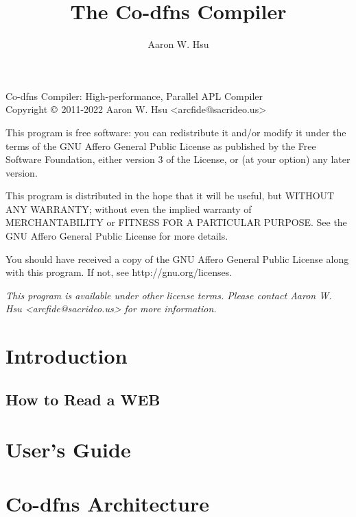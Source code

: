 \documentclass{article}%
\begin{document}
\nwdocspar
\title{The Co-dfns Compiler}
\author{Aaron W. Hsu}

\maketitle

\vfill

\noindent
Co-dfns Compiler: High-performance, Parallel APL Compiler\\
Copyright $\copyright$ 2011-2022 Aaron W. Hsu <arcfide@sacrideo.us>
\medskip

\noindent
This program is free software: you can redistribute it and/or
modify it under the terms of the GNU Affero General Public License as
published by the Free Software Foundation, either version 3 of the
License, or (at your option) any later version.
\medskip

\noindent
This program is distributed in the hope that it will be useful,
but WITHOUT ANY WARRANTY; without even the implied warranty of
MERCHANTABILITY or FITNESS FOR A PARTICULAR PURPOSE.    See the
GNU Affero General Public License for more details.\medskip

\noindent
You should have received a copy of the GNU Affero General Public License
along with this program.
If not, see http://gnu.org/licenses.
\medskip

\noindent
\emph{This program is available under other license terms. Please contact
Aaron W. Hsu <arcfide@sacrideo.us> for more information.}


\clearpage

\tableofcontents

\clearpage

\section{Introduction}

\subsection{How to Read a WEB}

\section{User's Guide}

\section{Co-dfns Architecture}
\end{document}
